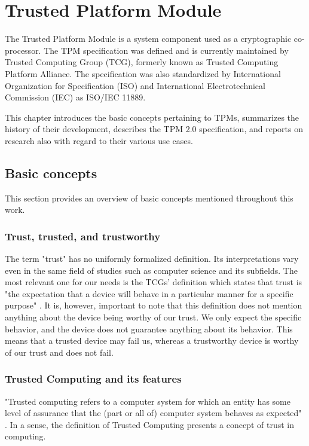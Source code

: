 \chapter{Trusted Platform Module}
The Trusted Platform Module is a system component used as a cryptographic co-processor. The TPM specification was defined and is currently maintained by Trusted Computing Group (TCG), formerly known as Trusted Computing Platform Alliance. The specification was also standardized by International Organization for Specification (ISO) and International Electrotechnical Commission (IEC) as ISO/IEC 11889.

This chapter introduces the basic concepts pertaining to TPMs, summarizes the history of their development, describes the TPM 2.0 specification, and reports on research also with regard to their various use cases. 

\section{Basic concepts}
This section provides an overview of basic concepts mentioned throughout this work.

\subsection{Trust, trusted, and trustworthy}\label{sec:trust-def}
The term "trust" has no uniformly formalized definition. Its interpretations vary even in the same field of studies such as computer science and its subfields. The most relevant one for our needs is the TCGs' definition which states that trust is "the expectation that a device will behave in a particular manner for a specific purpose" \cite{tcg_arch_overview}. It is, however, important to note that this definition does not mention anything about the device being worthy of our trust. We only expect the specific behavior, and the device does not guarantee anything about its behavior. This means that a trusted device may fail us, whereas a trustworthy device is worthy of our trust and does not fail.

\subsection{Trusted Computing and its features}
"Trusted computing refers to a computer system for which an entity has some level of assurance that the (part or all of) computer system behaves as expected" \cite{mitchell2005trusted}. In a sense, the definition of Trusted Computing presents a concept of trust in computing.

